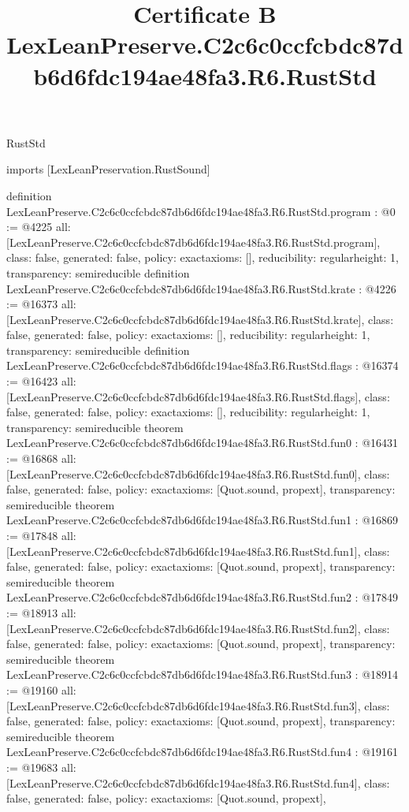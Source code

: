 \begin{lexlean}{RustStd}
\title{Certificate B LexLeanPreserve.C2c6c0ccfcbdc87db6d6fdc194ae48fa3.R6.RustStd}
\begin{coremodule}
imports [LexLeanPreservation.RustSound]

definition LexLeanPreserve.C2c6c0ccfcbdc87db6d6fdc194ae48fa3.R6.RustStd.program : @0 := @4225 {
  all: [LexLeanPreserve.C2c6c0ccfcbdc87db6d6fdc194ae48fa3.R6.RustStd.program],
  class: false,
  generated: false,
  policy: exact{axioms: []},
  reducibility: regular{height: 1},
  transparency: semireducible
}
definition LexLeanPreserve.C2c6c0ccfcbdc87db6d6fdc194ae48fa3.R6.RustStd.krate : @4226 := @16373 {
  all: [LexLeanPreserve.C2c6c0ccfcbdc87db6d6fdc194ae48fa3.R6.RustStd.krate],
  class: false,
  generated: false,
  policy: exact{axioms: []},
  reducibility: regular{height: 1},
  transparency: semireducible
}
definition LexLeanPreserve.C2c6c0ccfcbdc87db6d6fdc194ae48fa3.R6.RustStd.flags : @16374 := @16423 {
  all: [LexLeanPreserve.C2c6c0ccfcbdc87db6d6fdc194ae48fa3.R6.RustStd.flags],
  class: false,
  generated: false,
  policy: exact{axioms: []},
  reducibility: regular{height: 1},
  transparency: semireducible
}
theorem LexLeanPreserve.C2c6c0ccfcbdc87db6d6fdc194ae48fa3.R6.RustStd.fun0 : @16431 := @16868 {
  all: [LexLeanPreserve.C2c6c0ccfcbdc87db6d6fdc194ae48fa3.R6.RustStd.fun0],
  class: false,
  generated: false,
  policy: exact{axioms: [Quot.sound, propext]},
  transparency: semireducible
}
theorem LexLeanPreserve.C2c6c0ccfcbdc87db6d6fdc194ae48fa3.R6.RustStd.fun1 : @16869 := @17848 {
  all: [LexLeanPreserve.C2c6c0ccfcbdc87db6d6fdc194ae48fa3.R6.RustStd.fun1],
  class: false,
  generated: false,
  policy: exact{axioms: [Quot.sound, propext]},
  transparency: semireducible
}
theorem LexLeanPreserve.C2c6c0ccfcbdc87db6d6fdc194ae48fa3.R6.RustStd.fun2 : @17849 := @18913 {
  all: [LexLeanPreserve.C2c6c0ccfcbdc87db6d6fdc194ae48fa3.R6.RustStd.fun2],
  class: false,
  generated: false,
  policy: exact{axioms: [Quot.sound, propext]},
  transparency: semireducible
}
theorem LexLeanPreserve.C2c6c0ccfcbdc87db6d6fdc194ae48fa3.R6.RustStd.fun3 : @18914 := @19160 {
  all: [LexLeanPreserve.C2c6c0ccfcbdc87db6d6fdc194ae48fa3.R6.RustStd.fun3],
  class: false,
  generated: false,
  policy: exact{axioms: [Quot.sound, propext]},
  transparency: semireducible
}
theorem LexLeanPreserve.C2c6c0ccfcbdc87db6d6fdc194ae48fa3.R6.RustStd.fun4 : @19161 := @19683 {
  all: [LexLeanPreserve.C2c6c0ccfcbdc87db6d6fdc194ae48fa3.R6.RustStd.fun4],
  class: false,
  generated: false,
  policy: exact{axioms: [Quot.sound, propext]},
}
\end{coremodule}
\end{lexlean}
